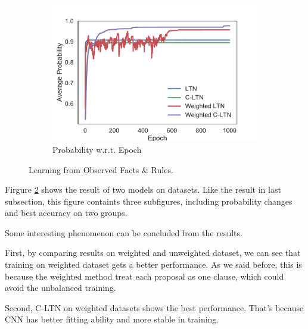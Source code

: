 \begin{figure}[!]
    \begin{subfigure}[]{0.24\textwidth}
        \includegraphics[width=\textwidth]{img/curve2.pdf}
        \caption{Probability w.r.t. Epoch}
        \label{fig:learning-prob-epoch}
    \end{subfigure}
    \caption{Learning from Observed Facts \& Rules.}
    \label{fig:learning}
\end{figure}

Firgure \ref{fig:learning} shows the result of two models on datasets. Like the result in last subsection, this figure containts three subfigures, including probability changes and best accuracy on two groups.

Some interesting phenomenon can be concluded from the results.

First, by comparing results on weighted and unweighted dataset, we can see that training on weighted dataset gets a better performance.
As we said before, this is because the weighted method treat each proposal as one clause, which could avoid the unbalanced training.

Second, C-LTN on weighted datasets shows the best performance. That's because CNN has better fitting ability and more stable in training.

